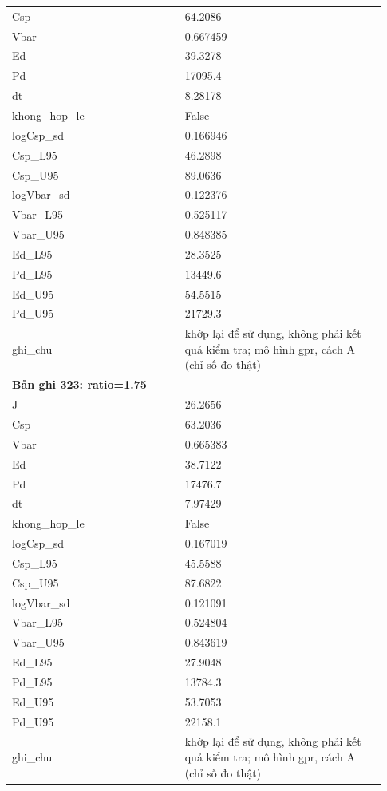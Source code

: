\begin{longtable}{p{0.43\linewidth}p{0.50\linewidth}}
Csp & 64.2086 \\
Vbar & 0.667459 \\
Ed & 39.3278 \\
Pd & 17095.4 \\
dt & 8.28178 \\
khong\_\allowbreak hop\_\allowbreak le & False \\
logCsp\_\allowbreak sd & 0.166946 \\
Csp\_\allowbreak L95 & 46.2898 \\
Csp\_\allowbreak U95 & 89.0636 \\
logVbar\_\allowbreak sd & 0.122376 \\
Vbar\_\allowbreak L95 & 0.525117 \\
Vbar\_\allowbreak U95 & 0.848385 \\
Ed\_\allowbreak L95 & 28.3525 \\
Pd\_\allowbreak L95 & 13449.6 \\
Ed\_\allowbreak U95 & 54.5515 \\
Pd\_\allowbreak U95 & 21729.3 \\
ghi\_\allowbreak chu & khớp lại để sử dụng, không phải kết quả kiểm tra; mô hình gpr, cách A (chỉ số đo thật) \\
\midrule
\multicolumn{2}{p{0.95\linewidth}}{\textbf{Bản ghi 323: ratio=1.75}} \\
J & 26.2656 \\
Csp & 63.2036 \\
Vbar & 0.665383 \\
Ed & 38.7122 \\
Pd & 17476.7 \\
dt & 7.97429 \\
khong\_\allowbreak hop\_\allowbreak le & False \\
logCsp\_\allowbreak sd & 0.167019 \\
Csp\_\allowbreak L95 & 45.5588 \\
Csp\_\allowbreak U95 & 87.6822 \\
logVbar\_\allowbreak sd & 0.121091 \\
Vbar\_\allowbreak L95 & 0.524804 \\
Vbar\_\allowbreak U95 & 0.843619 \\
Ed\_\allowbreak L95 & 27.9048 \\
Pd\_\allowbreak L95 & 13784.3 \\
Ed\_\allowbreak U95 & 53.7053 \\
Pd\_\allowbreak U95 & 22158.1 \\
ghi\_\allowbreak chu & khớp lại để sử dụng, không phải kết quả kiểm tra; mô hình gpr, cách A (chỉ số đo thật) \\

\end{longtable}
